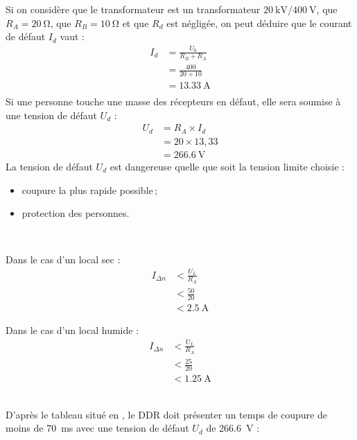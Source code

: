 \begin{exemple}
Si on considère que le transformateur est un transformateur $\SI{20}{\kilo\volt}/\SI{400}{\volt}$, que $R_A=\SI{20}{\ohm}$, que $R_B=\SI{10}{\ohm}$ et que $R_d$ est négligée, on peut déduire que le courant de défaut $I_d$ vaut :
\begin{align*}
		I_d 	&= \frac{U_{0}}{R_{B}+R_{A}} \\
				&=\frac{400}{20+10} \\
				&= \SI{13,33}{\ampere} \\
\end{align*}
Si une personne touche une masse des récepteurs en défaut, elle sera soumise à une tension de défaut $U_d$ :
\begin{align*}
		U_d 	&= R_{A} \times I_{d} \\
				&=20 \times 13,33 \\
				&= \SI{266,6}{\volt}
\end{align*}
La tension de défaut $U_d$ est dangereuse quelle que soit la tension limite choisie :
\begin{itemize}
\item coupure la plus rapide possible\,;
\item protection des personnes.
\end{itemize}
~\\
\begin{minipage}[t]{0.5\linewidth}
Dans le cas d'un local sec :
\begin{align*}
	I_{\Delta n} 	&< \frac{U_{L}}{R_{A}} \\
						&< \frac{50}{20} \\
						&< \SI{2,5}{\ampere}
\end{align*}
\end{minipage}
\hfill
\begin{minipage}[t]{0.5\linewidth}
Dans le cas d'un local humide :
\begin{align*}
	I_{\Delta n} 	&< \frac{U_{L}}{R_{A}} \\
						&< \frac{25}{20} \\
						&< \SI{1,25}{\ampere}
\end{align*}
\end{minipage}
~\\
D'après le tableau situé en , le DDR doit présenter un temps de coupure de moins de \SI{70}{\milli\second} avec une tension de défaut $U_d$ de \SI{266,6}{\volt} :


\end{exemple}
